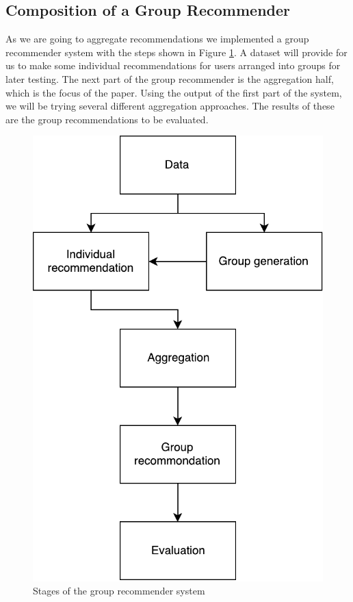 \subsection{Composition of a Group Recommender}
As we are going to aggregate recommendations we implemented a group recommender system with the steps shown in Figure \ref{fig:composition}. A dataset will provide for us to make some individual recommendations for users arranged into groups for later testing. The next part of the group recommender is the aggregation half, which is the focus of the paper. Using the output of the first part of the system, we will be trying several different aggregation approaches. The results of these are the group recommendations to be evaluated.
\begin{figure}
\centering
\includegraphics[scale=.4]{graphics/composition}
\caption{Stages of the group recommender system}\label{fig:composition}
\end{figure}

